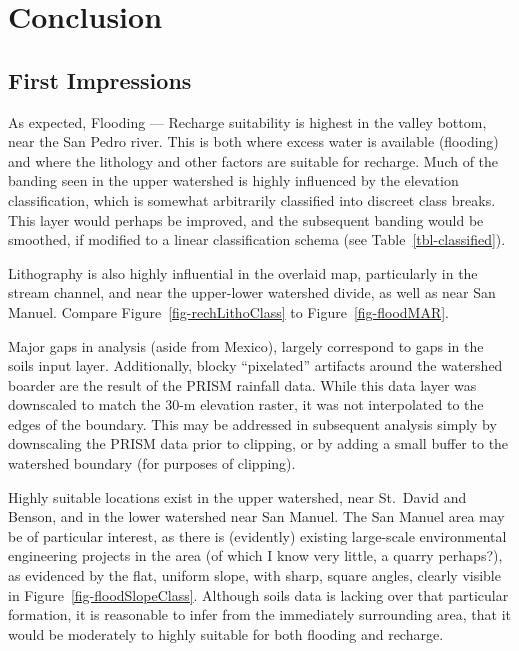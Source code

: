 \documentclass[
]{agujournal2019}
\begin{document}
\section{Conclusion}\label{conclusion}

\subsection{First Impressions}\label{first-impressions}

As expected, Flooding --- Recharge suitability is highest in the valley
bottom, near the San Pedro river. This is both where excess water is
available (flooding) and where the lithology and other factors are
suitable for recharge. Much of the banding seen in the upper watershed
is highly influenced by the elevation classification, which is somewhat
arbitrarily classified into discreet class breaks. This layer would
perhaps be improved, and the subsequent banding would be smoothed, if
modified to a linear classification schema (see
Table~\ref{tbl-classified}).

Lithography is also highly influential in the overlaid map, particularly
in the stream channel, and near the upper-lower watershed divide, as
well as near San Manuel. Compare Figure~\ref{fig-rechLithoClass} to
Figure~\ref{fig-floodMAR}.

Major gaps in analysis (aside from Mexico), largely correspond to gaps
in the soils input layer. Additionally, blocky ``pixelated'' artifacts
around the watershed boarder are the result of the PRISM rainfall data.
While this data layer was downscaled to match the 30-m elevation raster,
it was not interpolated to the edges of the boundary. This may be
addressed in subsequent analysis simply by downscaling the PRISM data
prior to clipping, or by adding a small buffer to the watershed boundary
(for purposes of clipping).

Highly suitable locations exist in the upper watershed, near St.~David
and Benson, and in the lower watershed near San Manuel. The San Manuel
area may be of particular interest, as there is (evidently) existing
large-scale environmental engineering projects in the area (of which I
know very little, a quarry perhaps?), as evidenced by the flat, uniform
slope, with sharp, square angles, clearly visible in
Figure~\ref{fig-floodSlopeClass}. Although soils data is lacking over
that particular formation, it is reasonable to infer from the
immediately surrounding area, that it would be moderately to highly
suitable for both flooding and recharge.
\end{document}
